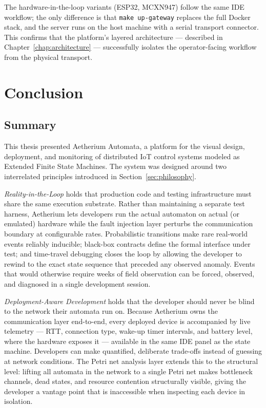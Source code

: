 The hardware-in-the-loop variants (ESP32, MCXN947) follow the same IDE workflow; the only difference is that \texttt{make up-gateway} replaces the full Docker stack, and the server runs on the host machine with a serial transport connector. This confirms that the platform's layered architecture --- described in Chapter~\ref{chap:architecture} --- successfully isolates the operator-facing workflow from the physical transport.

\chapter{Conclusion}
\label{chap:conclusion}

\section{Summary}

This thesis presented Aetherium Automata, a platform for the visual design, deployment, and monitoring of distributed IoT control systems modeled as Extended Finite State Machines. The system was designed around two interrelated principles introduced in Section~\ref{sec:philosophy}.

\textit{Reality-in-the-Loop} holds that production code and testing infrastructure must share the same execution substrate. Rather than maintaining a separate test harness, Aetherium lets developers run the actual automaton on actual (or emulated) hardware while the fault injection layer perturbs the communication boundary at configurable rates. Probabilistic transitions make rare real-world events reliably inducible; black-box contracts define the formal interface under test; and time-travel debugging closes the loop by allowing the developer to rewind to the exact state sequence that preceded any observed anomaly. Events that would otherwise require weeks of field observation can be forced, observed, and diagnosed in a single development session.

\textit{Deployment-Aware Development} holds that the developer should never be blind to the network their automata run on. Because Aetherium owns the communication layer end-to-end, every deployed device is accompanied by live telemetry --- RTT, connection type, wake-up timer intervals, and battery level, where the hardware exposes it --- available in the same IDE panel as the state machine. Developers can make quantified, deliberate trade-offs instead of guessing at network conditions. The Petri net analysis layer extends this to the structural level: lifting all automata in the network to a single Petri net makes bottleneck channels, dead states, and resource contention structurally visible, giving the developer a vantage point that is inaccessible when inspecting each device in isolation.

